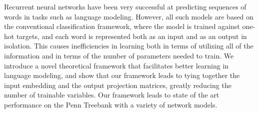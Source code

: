 Recurrent neural networks have been very successful at predicting sequences of words in tasks such as language modeling.
However, all such models are based on the conventional classification framework, where the model is trained against one-hot targets, and each word is represented both as an input and as an output in isolation.
This causes inefficiencies in learning both in terms of utilizing all of the information and in terms of the number of parameters needed to train.
We introduce a novel theoretical framework that facilitates better learning in language modeling, and show that our framework leads to tying together the input embedding and the output projection matrices, greatly reducing the number of trainable variables.
Our framework leads to state of the art performance on the Penn Treebank with a variety of network models.
